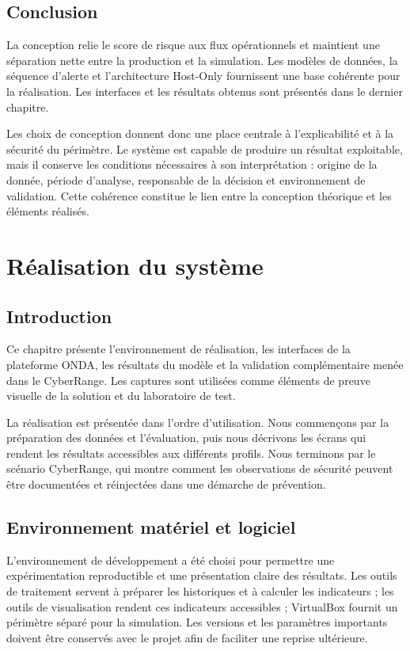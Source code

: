 \documentclass[12pt,a4paper,oneside]{report}
\begin{document}
\section{Conclusion}

La conception relie le score de risque aux flux opérationnels et maintient une séparation nette entre la production et la simulation. Les modèles de données, la séquence d’alerte et l’architecture Host-Only fournissent une base cohérente pour la réalisation. Les interfaces et les résultats obtenus sont présentés dans le dernier chapitre.

Les choix de conception donnent donc une place centrale à l’explicabilité et à la sécurité du périmètre. Le système est capable de produire un résultat exploitable, mais il conserve les conditions nécessaires à son interprétation : origine de la donnée, période d’analyse, responsable de la décision et environnement de validation. Cette cohérence constitue le lien entre la conception théorique et les éléments réalisés.

\clearpage
\chapter{Réalisation du système}

\section{Introduction}

Ce chapitre présente l’environnement de réalisation, les interfaces de la plateforme ONDA, les résultats du modèle et la validation complémentaire menée dans le CyberRange. Les captures sont utilisées comme éléments de preuve visuelle de la solution et du laboratoire de test.

La réalisation est présentée dans l’ordre d’utilisation. Nous commençons par la préparation des données et l’évaluation, puis nous décrivons les écrans qui rendent les résultats accessibles aux différents profils. Nous terminons par le scénario CyberRange, qui montre comment les observations de sécurité peuvent être documentées et réinjectées dans une démarche de prévention.

\section{Environnement matériel et logiciel}

L’environnement de développement a été choisi pour permettre une expérimentation reproductible et une présentation claire des résultats. Les outils de traitement servent à préparer les historiques et à calculer les indicateurs ; les outils de visualisation rendent ces indicateurs accessibles ; VirtualBox fournit un périmètre séparé pour la simulation. Les versions et les paramètres importants doivent être conservés avec le projet afin de faciliter une reprise ultérieure.
\end{document}
